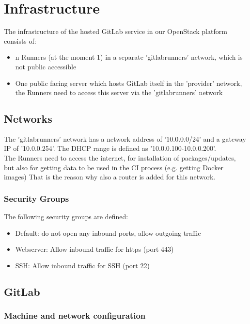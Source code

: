 \chapter{Infrastructure}

The infrastructure of the hosted GitLab service in our OpenStack platform consists of:
\begin{itemize}
    \item n Runners (at the moment 1) in a separate 'gitlabrunners' network, which is not public accessible
    \item One public facing server which hosts GitLab itself in the 'provider' network,
          the Runners need to access this server via the 'gitlabrunners' network
\end{itemize}

\section{Networks}

The 'gitlabrunners' network has a network address of '10.0.0.0/24' and a gateway IP of '10.0.0.254'.
The DHCP range is defined as '10.0.0.100-10.0.0.200'.\\

The Runners need to access the internet, for installation of packages/updates, but also for getting data to be used in the CI process (e.g. getting Docker images) 
That is the reason why also a router is added for this network.

\subsection{Security Groups}

The following security groups are defined:
\begin{itemize}
    \item Default: do not open any inbound ports, allow outgoing traffic
    \item Webserver: Allow inbound traffic for https (port 443)
	\item SSH: Allow inbound traffic for SSH (port 22)
\end{itemize}

\section{GitLab}

\subsection{Machine and network configuration}

